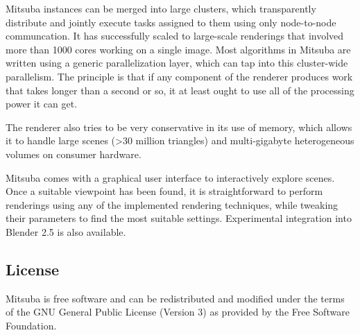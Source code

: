  Mitsuba instances can be merged into large clusters, which transparently distribute and 
jointly execute tasks assigned to them using only node-to-node communcation. It has successfully
scaled to large-scale renderings that involved more than 1000 cores working on a single image.
Most algorithms in Mitsuba  are written using a generic parallelization layer, which can tap 
into this cluster-wide parallelism. The principle is that if any component of the renderer produces
work that takes longer than a second or so, it at least ought to use all of the processing power 
it can get.

The renderer also tries to be very conservative in its use of memory, which allows it to handle 
large scenes (>30 million triangles) and multi-gigabyte heterogeneous volumes on consumer hardware.

Mitsuba comes with a graphical user interface to interactively explore scenes. Once a suitable 
viewpoint has been found, it is straightforward to perform renderings using any of the 
implemented rendering techniques, while tweaking their parameters to find the most suitable 
settings. Experimental integration into Blender 2.5 is also available.

\subsection{License}
Mitsuba is free software and can be redistributed and modified under the terms of the GNU General 
Public License (Version 3) as provided by the Free Software Foundation.


